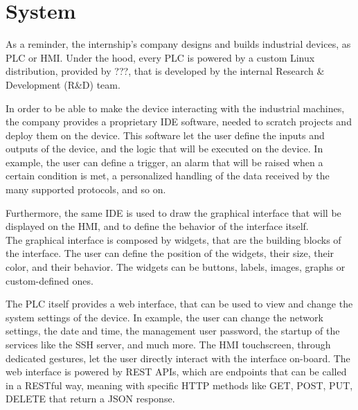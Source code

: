 \chapter{System}



As a reminder, the internship's company designs and builds industrial devices, as PLC or HMI. Under the hood, every PLC is powered by a custom Linux distribution, provided by ???, that is developed by the internal Research \& Development (R\&D) team.

In order to be able to make the device interacting with the industrial machines, the company provides a proprietary IDE software, needed to scratch projects and deploy them on the device. This software let the user define the inputs and outputs of the device, and the logic that will be executed on the device. In example, the user can define a trigger, an alarm that will be raised when a certain condition is met, a personalized handling of the data received by the many supported protocols, and so on.

Furthermore, the same IDE is used to draw the graphical interface that will be displayed on the HMI, and to define the behavior of the interface itself.\\
The graphical interface is composed by widgets, that are the building blocks of the interface. The user can define the position of the widgets, their size, their color, and their behavior. The widgets can be buttons, labels, images, graphs or custom-defined ones.

The PLC itself provides a web interface, that can be used to view and change the system settings of the device. In example, the user can change the network settings, the date and time, the management user password, the startup of the services like the SSH server, and much more. The HMI touchscreen, through dedicated gestures, let the user directly interact with the interface on-board. The web interface is powered by REST APIs, which are endpoints that can be called in a RESTful way, meaning with specific HTTP methods like GET, POST, PUT, DELETE that return a JSON response.

